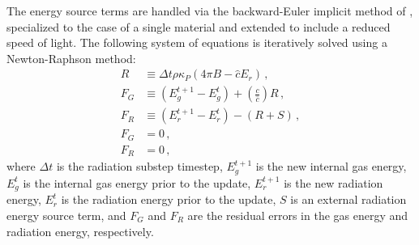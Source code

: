 \documentclass[fleqn,usenatbib]{mnras}
\begin{document}
The energy source terms are handled via the backward-Euler implicit method of \cite{Howell_2003}, specialized to the case of a single material and extended to include a reduced speed of light. The following system of equations is iteratively solved using a Newton-Raphson method:
\begin{align}
R &\equiv \Delta t \rho \kappa_P (4 \pi B - \hat c E_r) \, , \\
F_G &\equiv (E_g^{t+1} - E_g^{t}) + \left( \frac{c}{\hat c} \right) R \, , \\
F_R &\equiv (E_{r}^{t+1} - E_{r}^{t}) - \left( R + S \right) \, , \\
F_G &= 0 \, , \\
F_R &= 0 \, ,
\end{align}
where $\Delta t$ is the radiation substep timestep, $E_g^{t+1}$ is the new internal gas energy, $E_g^{t}$ is the internal gas energy prior to the update, $E_r^{t+1}$ is the new radiation energy, $E_r^t$ is the radiation energy prior to the update, $S$ is an external radiation energy source term, and $F_G$ and $F_R$ are the residual errors in the gas energy and radiation energy, respectively.
\end{document}
